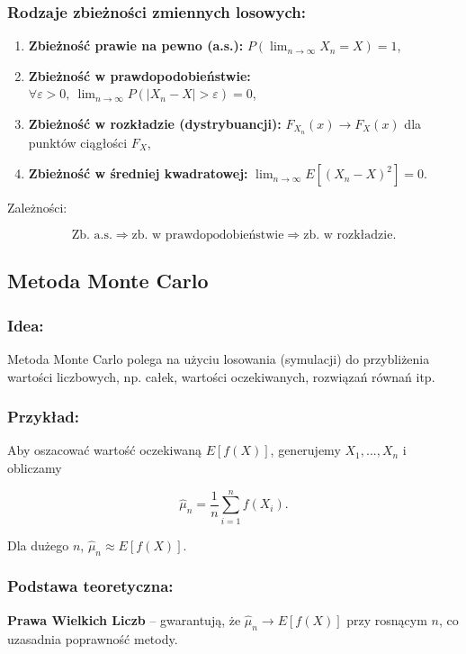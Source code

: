 \subsubsection*{Rodzaje zbieżności zmiennych losowych:}

\begin{enumerate}
    \item \textbf{Zbieżność prawie na pewno (a.s.):} $P(\lim_{n \to \infty} X_n = X) = 1$,
    \item \textbf{Zbieżność w prawdopodobieństwie:} $\forall \varepsilon > 0, \ \lim_{n \to \infty} P(|X_n - X| > \varepsilon) = 0$,
    \item \textbf{Zbieżność w rozkładzie (dystrybuancji):} $F_{X_n}(x) \to F_X(x)$ dla punktów ciągłości $F_X$,
    \item \textbf{Zbieżność w średniej kwadratowej:} $\lim_{n \to \infty} E[(X_n - X)^2] = 0$.
\end{enumerate}

Zależności:

$$
\text{Zb. a.s.} \Rightarrow \text{zb. w prawdopodobieństwie} \Rightarrow \text{zb. w rozkładzie}.
$$

\subsection{Metoda Monte Carlo}
\subsubsection*{Idea:}
Metoda Monte Carlo polega na użyciu losowania (symulacji) do przybliżenia wartości liczbowych, np. całek, wartości oczekiwanych, rozwiązań równań itp.

\subsubsection*{Przykład:}
Aby oszacować wartość oczekiwaną $E[f(X)]$, generujemy $X_1, ..., X_n$ i obliczamy

$$
\hat{\mu}_n = \frac{1}{n} \sum_{i=1}^n f(X_i).
$$

Dla dużego $n$, $\hat{\mu}_n \approx E[f(X)]$.

\subsubsection*{Podstawa teoretyczna:}
\textbf{Prawa Wielkich Liczb} -- gwarantują, że $\hat{\mu}_n \to E[f(X)]$ przy rosnącym $n$, co uzasadnia poprawność metody.

